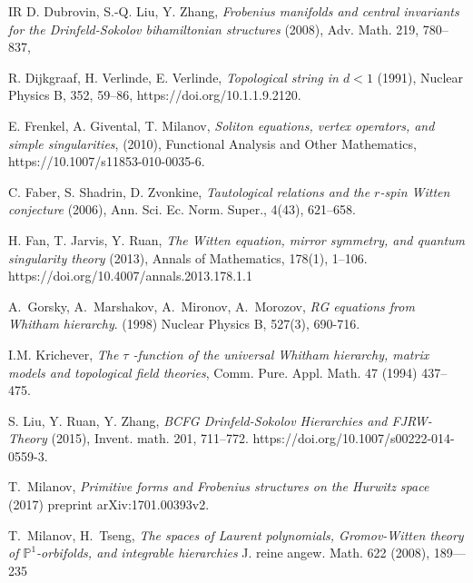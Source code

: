 \documentclass[12pt,a4paper]{amsart}
\newcommand{\PP}{{\mathbb{P}}}
\newcommand{\<}{\left<}
\renewcommand{\>}{\right>}
\numberwithin{equation}{section}
\begin{document}
\begin{thebibliography}{IR}
D. Dubrovin, S.-Q. Liu, Y. Zhang, \textit{Frobenius manifolds and central invariants for the Drinfeld-Sokolov bihamiltonian structures} (2008), Adv. Math. 219, 780--837,

R. Dijkgraaf, H. Verlinde, E. Verlinde, \textit{Topological string in $d<1$}  (1991), Nuclear Physics B, 352, 59--86, https://doi.org/10.1.1.9.2120.


E. Frenkel, A. Givental, T. Milanov, \textit{Soliton equations, vertex operators, and simple singularities}, (2010), Functional Analysis and Other Mathematics, https://10.1007/s11853-010-0035-6.

 C. Faber, S. Shadrin, D. Zvonkine, \textit{Tautological relations and the $r$-spin Witten conjecture} (2006), Ann. Sci. Ec. Norm. Super., 4(43), 621--658.

 H. Fan, T. Jarvis, Y. Ruan, \textit{The Witten equation, mirror symmetry, and quantum singularity theory} (2013), Annals of Mathematics, 178(1), 1--106. https://doi.org/10.4007/annals.2013.178.1.1

 A.~Gorsky, A.~Marshakov, A.~Mironov, A.~Morozov, \textit{RG equations from Whitham hierarchy}. (1998) Nuclear Physics B, 527(3), 690-716.
 
I.M. Krichever, \textit{The $\tau$ -function of the universal Whitham hierarchy,
matrix models and topological field theories}, Comm. Pure. Appl. Math.
47 (1994) 437–475.

S. Liu, Y. Ruan, Y. Zhang, \textit{BCFG Drinfeld-Sokolov Hierarchies and FJRW-Theory} (2015), Invent. math. 201, 711--772. https://doi.org/10.1007/s00222-014-0559-3.


 T.~Milanov,
 \textit{Primitive forms and Frobenius structures on the Hurwitz space}
 (2017) preprint arXiv:1701.00393v2.

 T.~Milanov, H.~Tseng,
 \textit{The spaces of Laurent polynomials, Gromov-Witten theory of $\PP^1$-orbifolds, and integrable hierarchies}
 J. reine angew. Math. 622 (2008), 189—235



\end{thebibliography}
\end{document}
